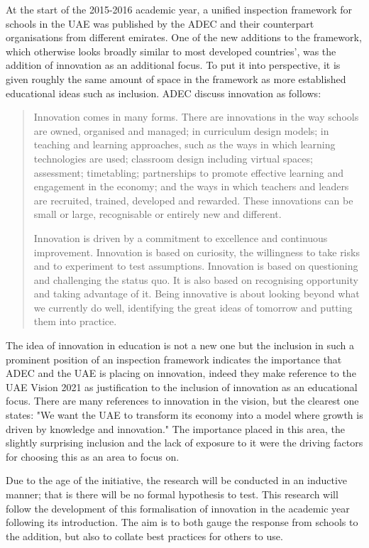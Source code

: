 At the start of the 2015-2016 academic year, a unified inspection framework for schools in the UAE was published by the ADEC and their counterpart organisations from different emirates. One of the new additions to the framework, which otherwise looks broadly similar to most developed countries', was the addition of innovation as an additional focus. To put it into perspective, it is given roughly the same amount of space in the framework as more established educational ideas such as inclusion. ADEC discuss innovation as follows:

\begin{quote}
Innovation comes in many forms. There are innovations in the way schools are owned, organised and managed; in curriculum design models; in teaching and learning approaches, such as the ways in which learning technologies are used; classroom design including virtual spaces; assessment; timetabling; partnerships to promote effective learning and engagement in the economy; and the ways in which teachers and leaders are recruited, trained, developed and rewarded. These innovations can be small or large, recognisable or entirely new and different.

Innovation is driven by a commitment to excellence and continuous improvement. Innovation is based on curiosity, the willingness to take risks and to experiment to test assumptions. Innovation is based on questioning and challenging the status quo. It is also based on recognising opportunity and taking advantage of it. Being innovative is about looking beyond what we currently do well, identifying the great ideas of tomorrow and putting them into practice.
\end{quote} \cite[p.12]{ADEC2015}

The idea of innovation in education is not a new one but the inclusion in such a prominent position of an inspection framework indicates the importance that ADEC and the UAE is placing on innovation, indeed they make reference to the UAE Vision 2021 as justification to the inclusion of innovation as an educational focus. There are many references to innovation in the vision, but the clearest one states: "We want the UAE to transform its economy into a model where growth is driven by knowledge and innovation." \cite{UAEGovernment2012} The importance placed in this area, the slightly surprising inclusion and the lack of exposure to it were the driving factors for choosing this as an area to focus on.

Due to the age of the initiative, the research will be conducted in an inductive manner; that is there will be no formal hypothesis to test. This research will follow the development of this formalisation of innovation in the academic year following its introduction. The aim is to both gauge the response from schools to the addition, but also to collate best practices for others to use.


